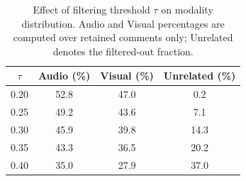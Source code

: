 \begin{table}[h]
  \centering
  \small
  \caption{Effect of filtering threshold $\tau$ on modality distribution. Audio and Visual percentages are computed over retained comments only; Unrelated denotes the filtered-out fraction.}
  \label{tab:tau_ablation}
  \begin{tabular}{cccc}
    \toprule
    \textbf{$\tau$} & \textbf{Audio (\%)} & \textbf{Visual (\%)} & \textbf{Unrelated (\%)} \\
    \midrule
    0.20 & 52.8 & 47.0 & \phantom{0}0.2 \\
    0.25 & 49.2 & 43.6 & \phantom{0}7.1 \\
    0.30 & 45.9 & 39.8 & 14.3 \\
    0.35 & 43.3 & 36.5 & 20.2 \\
    0.40 & 35.0 & 27.9 & 37.0 \\
    \bottomrule
  \end{tabular}
  \vspace{-0.5em}
\end{table}
